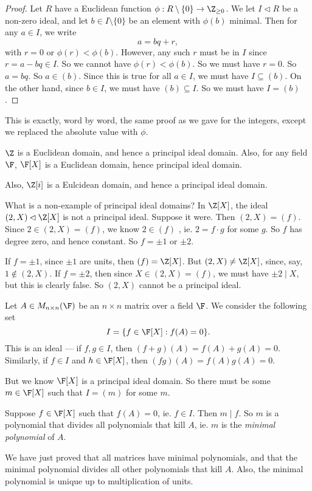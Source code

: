 \documentclass[a4paper]{article}
\begin{document}
\begin{proof}
  Let $R$ have a Euclidean function $\phi: R \setminus \{0\} \to \Z_{\geq 0}$. We let $I \lhd R$ be a non-zero ideal, and let $b \in I\setminus \{0\}$ be an element with $\phi(b)$ minimal. Then for any $a \in I$, we write
  \[
    a = bq + r,
  \]
  with $r = 0$ or $\phi(r) < \phi(b)$. However, any such $r$ must be in $I$ since $r = a - bq \in I$. So we cannot have $\phi(r) < \phi(b)$. So we must have $r = 0$. So $a = bq$. So $a \in (b)$. Since this is true for all $a \in I$, we must have $I \subseteq (b)$. On the other hand, since $b \in I$, we must have $(b) \subseteq I$. So we must have $I = (b)$.
\end{proof}
This is exactly, word by word, the same proof as we gave for the integers, except we replaced the absolute value with $\phi$.

\begin{eg}
  $\Z$ is a Euclidean domain, and hence a principal ideal domain. Also, for any field $\F$, $\F[X]$ is a Euclidean domain, hence principal ideal domain.

  Also, $\Z[i]$ is a Eulcidean domain, and hence a principal ideal domain.

  What is a non-example of principal ideal domains? In $\Z[X]$, the ideal $(2, X) \lhd \Z[X]$ is not a principal ideal. Suppose it were. Then $(2, X) = (f)$. Since $2 \in (2, X) = (f)$, we know $2 \in (f)$ , ie. $2 = f\cdot g$ for some $g$. So $f$ has degree zero, and hence constant. So $f = \pm 1$ or $\pm 2$.

  If $f = \pm 1$, since $\pm 1$ are units, then $(f) = \Z[X]$. But $(2, X) \not= \Z[X]$, since, say, $1 \not\in (2, X)$. If $f = \pm 2$, then since $X \in (2, X) = (f)$, we must have $\pm 2 \mid X$, but this is clearly false. So $(2, X)$ cannot be a principal ideal.
\end{eg}

\begin{eg}
  Let $A \in M_{n \times n}(\F)$ be an $n \times n$ matrix over a field $\F$. We consider the following set
  \[
    I = \{f \in \F[X]: f(A) = 0\}.
  \]
  This is an ideal --- if $f, g \in I$, then $(f + g)(A) = f(A) + g(A) = 0$. Similarly, if $f \in I$ and $h \in \F[X]$, then $(fg)(A) = f(A)g(A) = 0$.

  But we know $\F[X]$ is a principal ideal domain. So there must be some $m \in \F[X]$ such that $I = (m)$ for some $m$.

  Suppose $f \in \F[X]$ such that $f(A) = 0$, ie. $f \in I$. Then $m \mid f$. So $m$ is a polynomial that divides all polynomials that kill $A$, ie. $m$ is the \emph{minimal polynomial} of $A$.

  We have just proved that all matrices have minimal polynomials, and that the minimal polynomial divides all other polynomials that kill $A$. Also, the minimal polynomial is unique up to multiplication of units.
\end{eg}
\end{document}
